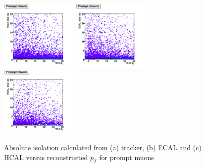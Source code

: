  \begin{figure}[htbp]
    \includegraphics[width = 0.33\textwidth]{pictures/recoPt_absIso/trackIso_muon_prompt.png}
    \includegraphics[width = 0.33\textwidth]{pictures/recoPt_absIso/ecalIso_muon_prompt.png}
    \includegraphics[width = 0.33\textwidth]{pictures/recoPt_absIso/hcalIso_muon_prompt.png}
    \caption{Absolute isolation calculated from (a) tracker, (b) ECAL and (c) HCAL versus
       reconstructed $p_{T}$ for prompt muons}
    \label{fig:PromptMuonRecoPt_AbsIso}
 \end{figure}


